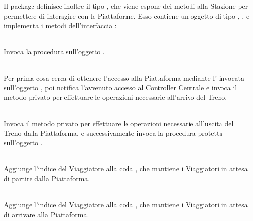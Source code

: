 	Il package  definisce inoltre il tipo  , che viene espone dei metodi alla Stazione per permettere di interagire con le Piattaforme. Esso contiene un oggetto di tipo , , e implementa i metodi dell'interfaccia :
	\begin{description}
		
		\item {} \\
			Invoca la procedura  sull'oggetto .
		
		\item {}\\
		Per prima cosa cerca di ottenere l'accesso alla Piattaforma mediante l'  invocata sull'oggetto , poi notifica l'avvenuto accesso al Controller Centrale e invoca il metodo privato  per effettuare le operazioni necessarie all'arrivo del Treno.
		
		\item {}\\
		Invoca il metodo privato  per effettuare le operazioni necessarie all'uscita del Treno dalla Piattaforma, e successivamente invoca la procedura protetta  sull'oggetto .
		
		\item {}\\
		Aggiunge l'indice del Viaggiatore  alla coda , che mantiene i Viaggiatori in attesa di partire dalla Piattaforma.
		
		\item {}\\
		Aggiunge l'indice del Viaggiatore  alla coda , che mantiene i Viaggiatori in attesa di arrivare alla Piattaforma.
		

\end{description}
